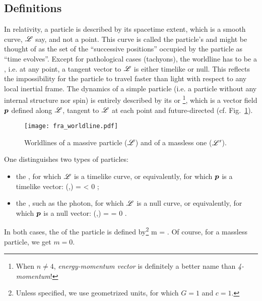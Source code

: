 \subsection{Definitions} \label{s:fra:worldlines_def}

In relativity, a particle is described by its spacetime extent, which is a smooth curve,
$\mathscr{L}$ say, and not a point. This curve is called the particle's
 and might be thought of as the set of
the ``successive positions'' occupied by the particle as ``time evolves''.
Except for pathological cases (tachyons),
the worldline has to be a , i.e.
at any point, a tangent vector to $\mathscr{L}$  is either timelike or null.
This reflects the impossibility for the particle to travel faster than light with respect
to any local inertial frame.
The dynamics of a simple particle (i.e. a particle without any internal structure nor
spin) is entirely described by its
 or \footnote{When $n\not=4$, \emph{energy-momentum vector} is definitely a better name
than \emph{4-momentum}!}, which is a vector field $\bm{p}$ defined along $\mathscr{L}$,
tangent to $\mathscr{L}$ at each point and future-directed (cf. Fig.~\ref{f:fra:worldline}).

\begin{figure}
\centerline{\texttt{[image: fra\_worldline.pdf]}}
\caption[]{\label{f:fra:worldline} \footnotesize
Worldlines of a massive particle ($\mathscr{L}$) and of a massless one ($\mathscr{L}'$).}
\end{figure}


One distinguishes two types of particles:
\begin{itemize}
\item the , for which
$\mathscr{L}$ is a timelike curve, or equivalently, for which
$\bm{p}$ is a timelike vector:
\be
    (,) = \cdot{} < 0 ;
\ee
\item the ,
such as the photon,
for which $\mathscr{L}$ is a null curve, or equivalently, for which  $\bm{p}$ is a null vector:
\be
    (,) = \cdot{} = 0 .
\ee
\end{itemize}
In both cases, the  of the particle is defined by\footnote{Unless specified, we use geometrized units, for which $G=1$ and $c=1$.}
\be \label{e:fra:def_mass}
   m =  .
\ee
Of course, for a massless particle, we get $m=0$.

